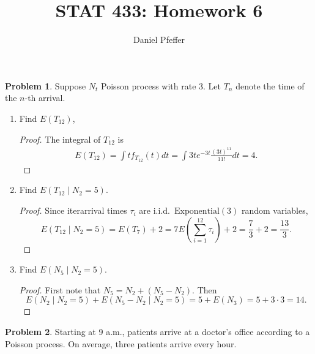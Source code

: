 \documentclass[oneside]{amsart}
\title{STAT 433: Homework 6}
\author{Daniel Pfeffer}
\newcommand{\Exp}{\mathrm{Exponential}}
\theoremstyle{definition}
\newtheorem{prob}{Problem}
\begin{document}
\maketitle

\begin{prob}
Suppose $N_t$ Poisson process with rate 3. Let $T_n$ denote the time of the $n$-th arrival.
\end{prob}

\begin{enumerate}
\item
Find $E (T_{12})$, 
\begin{proof}
The integral of $T_{12}$ is
\begin{align*}
	E (T_{12}) = \int t f_{T_{12}}(t) dt = \int 3te^{-3 t} \frac{(3t)^{11}}{11!} dt = 4.
\end{align*}
\end{proof}
\item
Find $E(T_{12} \mid N_2 = 5)$.
\begin{proof}
Since iterarrival times $\tau_i$ are i.i.d.\ $\Exp(3)$ random variables,
\[
	E(T_{12} \mid N_2 = 5) 
	= E (T_7) + 2 
	= 7 E\left(\sum_{i=1}^{12} \tau_i\right) + 2= \frac{7}{3} + 2 = \frac{13}{3}.
\]
\end{proof}
\item
Find $E(N_5 \mid N_2 = 5)$. 
\begin{proof}
First note that $N_5 = N_2 + (N_5 - N_2)$. Then 
\[
	E(N_2 \mid N_2 = 5) + E(N_5 - N_2 \mid N_2 = 5) = 5 + E (N_3) = 5 + 3 \cdot 3 = 14.
\]
\end{proof}
\end{enumerate}


\begin{prob}
Starting at 9 a.m., patients arrive at a doctor's office according to a Poisson process. On average, three patients arrive every hour.
\end{prob}
\end{document}
